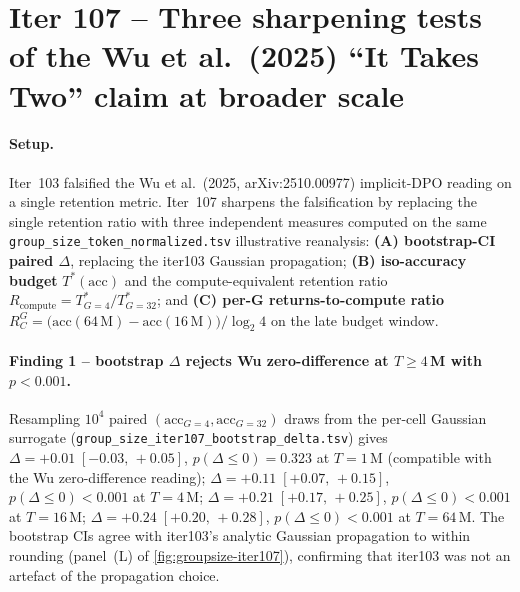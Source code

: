 \section{Iter 107 -- Three sharpening tests of the Wu et al.\ (2025)
``It Takes Two'' claim at broader scale}
\label{sec:group-size-iter107}

\paragraph{Setup.}
Iter~103 falsified the Wu et al.\ (2025, arXiv:2510.00977) implicit-DPO
reading on a single retention metric.  Iter~107 sharpens the
falsification by replacing the single retention ratio with three
independent measures computed on the same
\texttt{group\_size\_token\_normalized.tsv} illustrative reanalysis:
\textbf{(A) bootstrap-CI paired $\Delta$}, replacing the iter103
Gaussian propagation; \textbf{(B) iso-accuracy budget}
$T^*(\mathrm{acc})$ and the compute-equivalent retention ratio
$R_{\mathrm{compute}} = T^*_{G=4}/T^*_{G=32}$; and \textbf{(C) per-G
returns-to-compute ratio} $R_C^G = \bigl(\mathrm{acc}(64\,\mathrm{M})
- \mathrm{acc}(16\,\mathrm{M})\bigr)/\log_2 4$ on the late budget window.

\paragraph{Finding 1 -- bootstrap $\Delta$ rejects Wu zero-difference
at $T\ge 4\,$M with $p<0.001$.}
Resampling $10^4$ paired $(\mathrm{acc}_{G=4}, \mathrm{acc}_{G=32})$
draws from the per-cell Gaussian surrogate
(\texttt{group\_size\_iter107\_bootstrap\_delta.tsv}) gives
$\Delta = +0.01\;[-0.03,\,+0.05]$, $p(\Delta\le 0)=0.323$ at
$T{=}1\,$M (compatible with the Wu zero-difference reading);
$\Delta = +0.11\;[+0.07,\,+0.15]$, $p(\Delta\le 0)<0.001$ at
$T{=}4\,$M;
$\Delta = +0.21\;[+0.17,\,+0.25]$, $p(\Delta\le 0)<0.001$ at
$T{=}16\,$M;
$\Delta = +0.24\;[+0.20,\,+0.28]$, $p(\Delta\le 0)<0.001$ at
$T{=}64\,$M.  The bootstrap CIs agree with iter103's analytic
Gaussian propagation to within rounding (panel~(L) of
\autoref{fig:groupsize-iter107}), confirming that iter103 was not an
artefact of the propagation choice.

